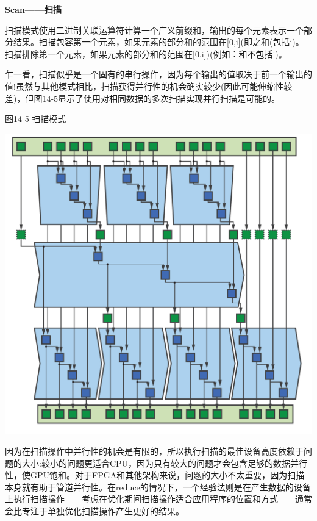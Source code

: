 \hspace*{\fill} \par %
\textbf{Scan——扫描}

扫描模式使用二进制关联运算符计算一个广义前缀和，输出的每个元素表示一个部分结果。扫描包容第一个元素，如果元素的部分和的范围在[0,i](即之和(包括i)。扫描排除第一个元素，如果元素的部分和的范围在[0,i])(例如：和不包括i)。\par

乍一看，扫描似乎是一个固有的串行操作，因为每个输出的值取决于前一个输出的值!虽然与其他模式相比，扫描获得并行性的机会确实较少(因此可能伸缩性较差)，但图14-5显示了使用对相同数据的多次扫描实现并行扫描是可能的。\par

\hspace*{\fill} \par %
图14-5 扫描模式
\begin{center}
	\includegraphics[width=1.\textwidth]{content/chapter-14/images/5}
\end{center}

因为在扫描操作中并行性的机会是有限的，所以执行扫描的最佳设备高度依赖于问题的大小:较小的问题更适合CPU，因为只有较大的问题才会包含足够的数据并行性，使GPU饱和。对于FPGA和其他架构来说，问题的大小不太重要，因为扫描本身就有助于管道并行性。在reduce的情况下，一个经验法则是在产生数据的设备上执行扫描操作——考虑在优化期间扫描操作适合应用程序的位置和方式——通常会比专注于单独优化扫描操作产生更好的结果。\par

